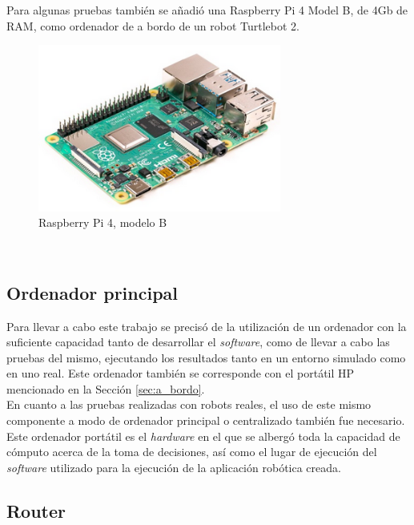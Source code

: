 Para algunas pruebas también se añadió una Raspberry Pi 4 Model B, de 4Gb de
RAM, como ordenador de a bordo de un robot Turtlebot 2.
\\

\begin{figure} [h!]
  \begin{center}
    \includegraphics[width=8cm]{figs/raspberry_pi_4b}
  \end{center}
  \caption{Raspberry Pi 4, modelo B \citep{raspberry_pi_4b}}
  \label{fig:raspberry_pi}
\end{figure}\


\subsection{Ordenador principal}
\label{sec:ordenador_principal}

Para llevar a cabo este trabajo se precisó de la utilización de un ordenador con
la suficiente capacidad tanto de desarrollar el \textit{software}, como de
llevar a cabo las pruebas del mismo, ejecutando los resultados tanto en un
entorno simulado como en uno real.
Este ordenador también se corresponde con el portátil HP mencionado en la
Sección \ref{sec:a_bordo}.
\\

En cuanto a las pruebas realizadas con robots reales, el uso de este mismo
componente a modo de ordenador principal o centralizado también fue necesario.
Este ordenador portátil es el \textit{hardware} en el que se albergó toda la
capacidad de cómputo acerca de la toma de decisiones, así como el lugar de
ejecución del \textit{software} utilizado para la ejecución de la aplicación
robótica creada.
\\

\subsection{Router}
\label{sec:router}

